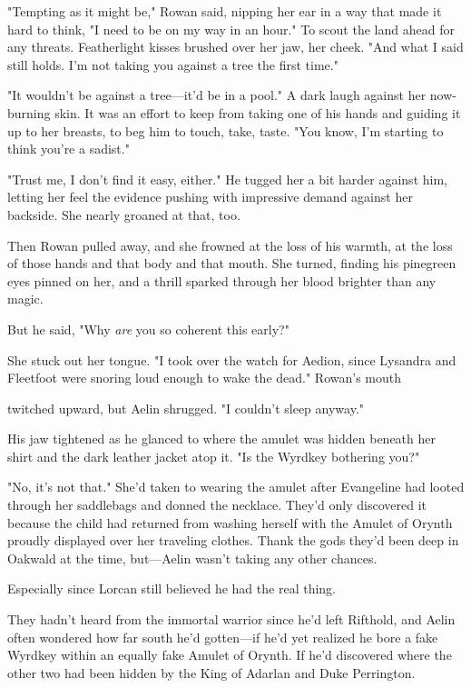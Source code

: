 "Tempting as it might be," Rowan said, nipping her ear in a way that made it hard to think, "I need to be on my way in an hour." To scout the land ahead for any threats. Featherlight kisses brushed over her jaw, her cheek. "And what I said still holds. I'm not taking you against a tree the first time."

"It wouldn't be against a tree---it'd be in a pool." A dark laugh against her now-burning skin. It was an effort to keep from taking one of his hands and guiding it up to her breasts, to beg him to touch, take, taste. "You know, I'm starting to think you're a sadist."

"Trust me, I don't find it easy, either." He tugged her a bit harder against him, letting her feel the evidence pushing with impressive demand against her backside. She nearly groaned at that, too.

Then Rowan pulled away, and she frowned at the loss of his warmth, at the loss of those hands and that body and that mouth. She turned, finding his pinegreen eyes pinned on her, and a thrill sparked through her blood brighter than any magic.

But he said, "Why \emph{are} you so coherent this early?"

She stuck out her tongue. "I took over the watch for Aedion, since Lysandra and Fleetfoot were snoring loud enough to wake the dead." Rowan's mouth

twitched upward, but Aelin shrugged. "I couldn't sleep anyway."

His jaw tightened as he glanced to where the amulet was hidden beneath her shirt and the dark leather jacket atop it. "Is the Wyrdkey bothering you?"

"No, it's not that." She'd taken to wearing the amulet after Evangeline had looted through her saddlebags and donned the necklace. They'd only discovered it because the child had returned from washing herself with the Amulet of Orynth proudly displayed over her traveling clothes. Thank the gods they'd been deep in Oakwald at the time, but---Aelin wasn't taking any other chances.

Especially since Lorcan still believed he had the real thing.

They hadn't heard from the immortal warrior since he'd left Rifthold, and Aelin often wondered how far south he'd gotten---if he'd yet realized he bore a fake Wyrdkey within an equally fake Amulet of Orynth. If he'd discovered where the other two had been hidden by the King of Adarlan and Duke Perrington.

